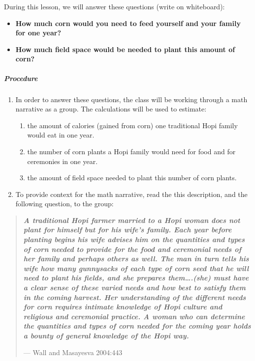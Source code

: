 \documentclass[12pt,]{article}
\providecommand{\tightlist}{%
  \setlength{\itemsep}{0pt}\setlength{\parskip}{0pt}}
\let\oldsubparagraph\subparagraph
\renewcommand{\subparagraph}[1]{\oldsubparagraph{#1}\mbox{}}
\begin{document}
During this lesson, we will answer these questions (write on whiteboard):

\begin{itemize}
\tightlist
\item
  \textbf{How much corn would you need to feed yourself and your family for one year?}
\item
  \textbf{How much field space would be needed to plant this amount of corn? }
\end{itemize}

\hypertarget{procedure-4}{%
\subparagraph{Procedure}\label{procedure-4}}

\begin{enumerate}
\def\labelenumi{\arabic{enumi}.}
\tightlist
\item
  In order to answer these questions, the class will be working through a math narrative as a group. The calculations will be used to estimate:

  \begin{enumerate}
  \def\labelenumii{\arabic{enumii}.}
  \tightlist
  \item
    the amount of calories (gained from corn) one traditional Hopi family would eat in one year.
  \item
    the number of corn plants a Hopi family would need for food and for ceremonies in one year.
  \item
    the amount of field space needed to plant this number of corn plants.
  \end{enumerate}
\item
  To provide context for the math narrative, read the this description, and the following question, to the group:
\end{enumerate}

\begin{quote}
\textbf{\emph{A traditional Hopi farmer married to a Hopi woman does not plant for himself but for his wife's family. Each year before planting begins his wife advises him on the quantities and types of corn needed to provide for the food and ceremonial needs of her family and perhaps others as well. The man in turn tells his wife how many gunnysacks of each type of corn seed that he will need to plant his fields, and she prepares them\ldots.(she) must have a clear sense of these varied needs and how best to satisfy them in the coming harvest. Her understanding of the different needs for corn requires intimate knowledge of Hopi culture and religious and ceremonial practice. A woman who can determine the quantities and types of corn needed for the coming year holds a bounty of general knowledge of the Hopi way.}}

--- Wall and Masayesva 2004:443
\end{quote}
\end{document}
